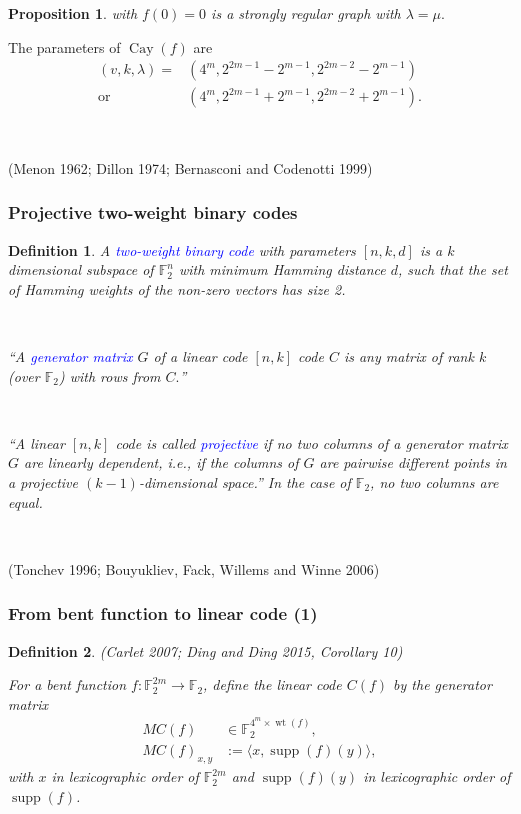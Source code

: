 \documentclass[pdf,sprung,slideColor,nocolorBG]{beamer}
\newenvironment{colortheme}[1]{
\def\ProvidesPackageRCS $##1${\relax}
\renewcommand{\ProcessOptions}{\relax}
\makeatletter

\makeatother
}{}
\newcommand{\slidecite}[1]{\tiny{(#1)}\normalsize{}}
\newcommand{\smallcite}[1]{\small{(#1)}\normalsize{}}
\newcommand{\mb}[1]{\mathbb{#1}}
\newcommand{\Emph}[1]{\emph{\textcolor{blue}{#1}}}
\newcommand{\To}{\rightarrow}
\newcommand{\Cay}[1]{\operatorname{Cay}\left(#1\right)}
\newcommand{\support}[1]{\operatorname{supp}\left(#1\right)}
\newcommand{\weight}[1]{\operatorname{wt}\left(#1\right)}
\newcommand{\F}{\mb{F}}
\newtheorem{Def}{Definition}
\newtheorem{Proposition}{Proposition}
\begin{document}
\begin{colortheme}{seagull}
\begin{frame}
\begin{Proposition}
with $f(0)=0$ is a strongly regular graph with $\lambda = \mu.$
\end{Proposition}

The parameters of $\Cay{f}$ are
\begin{align*}
(v,k,\lambda) = &(4^m, 2^{2 m - 1} - 2^{m-1}, 2^{2 m - 2} - 2^{m-1})
\\
  \text{or} \quad &(4^m, 2^{2 m - 1} + 2^{m-1}, 2^{2 m - 2} + 2^{m-1}).
\end{align*}

~

\slidecite{Menon 1962; Dillon 1974; Bernasconi and Codenotti 1999}
\end{frame}

\begin{frame}
\frametitle{Projective two-weight binary codes}

\begin{Def}
A \Emph{two-weight binary code} with parameters $[n,k,d]$ is a $k$ dimensional subspace of $\F_2^n$
with
minimum Hamming distance $d$, such that the set of Hamming weights of the non-zero vectors has size
2.

~

``A \Emph{generator matrix} $G$ of a linear code $[n, k]$ code $C$ is any matrix
of rank $k$ (over $\F_2$) with rows from $C.$''

~

``A linear $[n, k]$ code is called \Emph{projective} if no two columns of a generator matrix
$G$ are linearly dependent, i.e., if the columns of $G$ are pairwise different points in a
projective $(k-1)$-dimensional space.''
In the case of $\F_2$, no two columns are equal.

~

\end{Def}

\slidecite{Tonchev 1996; Bouyukliev, Fack, Willems and Winne 2006}

\end{frame}

\begin{frame}
\frametitle{From bent function to linear code (1)}
\begin{Def}

\smallcite{Carlet 2007; Ding and Ding 2015, Corollary 10}

For a bent function $f : \F_2^{2m} \To \F_2$,
define the linear code $C(f)$ by the generator matrix
\begin{align*}
M C(f) &\in \F_2^{4^m \times \weight{f}},
\\
M C(f)_{x,y} &:= \langle x, \support{f}(y) \rangle,
\end{align*}
with $x$ in lexicographic order of $\F_2^{2m}$
and $\support{f}(y)$ in lexicographic order of $\support{f}$.


\end{Def}
\end{frame}
\end{colortheme}
\end{document}
